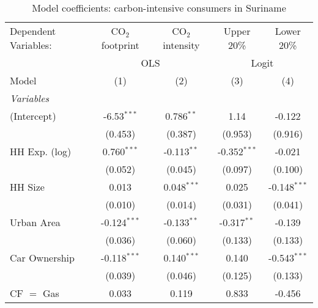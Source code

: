
\begin{table}[htbp!]
   \centering
   \small
   \begin{adjustbox}{width = 1\textwidth, max height = 0.95\textheight, center}
      \begin{threeparttable}[b]
         \caption{\label{tab:Logit_1_SUR} Model coefficients: carbon-intensive consumers in Suriname}
         \begin{tabular}{lcccc}
            \tabularnewline \midrule \midrule
            Dependent Variables: & CO$_{2}$ footprint & CO$_{2}$ intensity & Upper 20\%     & Lower 20\%\\   
             & \multicolumn{2}{c}{OLS} & \multicolumn{2}{c}{Logit} \\ 
            Model                & (1)                & (2)                & (3)            & (4)\\  
            \midrule
            \emph{Variables}\\
            (Intercept)          & -6.53$^{***}$      & 0.786$^{**}$       & 1.14           & -0.122\\   
                                 & (0.453)            & (0.387)            & (0.953)        & (0.916)\\   
            HH Exp. (log)        & 0.760$^{***}$      & -0.113$^{**}$      & -0.352$^{***}$ & -0.021\\   
                                 & (0.052)            & (0.045)            & (0.097)        & (0.100)\\   
            HH Size              & 0.013              & 0.048$^{***}$      & 0.025          & -0.148$^{***}$\\   
                                 & (0.010)            & (0.014)            & (0.031)        & (0.041)\\   
            Urban Area           & -0.124$^{***}$     & -0.133$^{**}$      & -0.317$^{**}$  & -0.139\\   
                                 & (0.036)            & (0.060)            & (0.133)        & (0.133)\\   
            Car Ownership        & -0.118$^{***}$     & 0.140$^{***}$      & 0.140          & -0.543$^{***}$\\   
                                 & (0.039)            & (0.046)            & (0.125)        & (0.133)\\   
            CF $=$ Gas           & 0.033              & 0.119              & 0.833          & -0.456\\   

\end{tabular}
\end{threeparttable}
\end{adjustbox}
\end{table}
